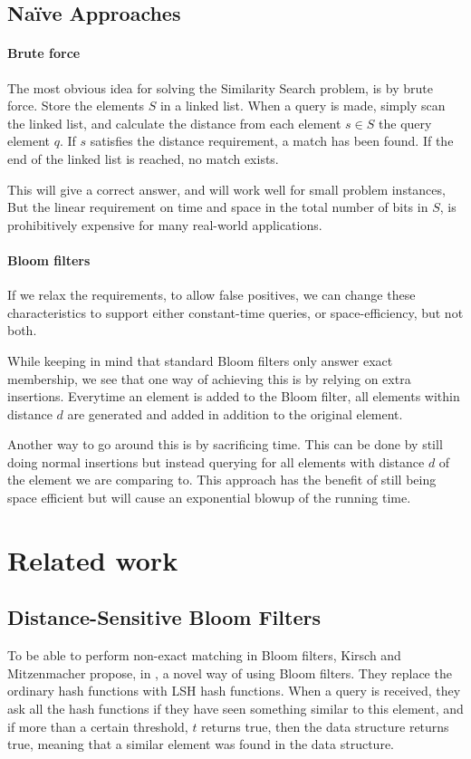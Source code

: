 \documentclass[a4paper,11pt]{article}
\begin{document}
\subsection{Naïve Approaches}

\paragraph{Brute force}
The most obvious idea for solving the Similarity Search problem, is by brute force. Store the elements $S$ in a linked list. When a query is made, simply scan the linked list, and calculate the distance from each element $s \in S$ the query element $q$. If $s$ satisfies the distance requirement, a match has been found. If the end of the linked list is reached, no match exists.

This will give a correct answer, and will work well for small problem instances, But the linear requirement on time and space in the total number of bits in $S$, is prohibitively expensive for many real-world applications.

\paragraph{Bloom filters} If we relax the requirements, to allow false positives, we can change these characteristics to support either constant-time queries, or space-efficiency, but not both. 

While keeping in mind that standard Bloom filters only answer exact membership, we see that one way of achieving this is by relying on extra insertions. Everytime an element is added to the Bloom filter, all elements within distance $d$ are generated and added in addition to the original element. 

Another way to go around this is by sacrificing time. This can be done by still doing normal insertions but instead querying for all elements with distance $d$ of the element we are comparing to. This approach has the benefit of still being space efficient but will cause an exponential blowup of the running time.

\section{Related work} %

\subsection{Distance-Sensitive Bloom Filters}
To be able to perform non-exact matching in Bloom filters, Kirsch and Mitzenmacher propose, in \cite{paper:harvard}, a novel way of using Bloom filters. They replace the ordinary hash functions with LSH hash functions. When a query is received, they ask all the hash functions if they have seen something similar to this element, and if more than a certain threshold, $t$ returns true, then the data structure returns true, meaning that a similar element was found in the data structure.
\end{document}
